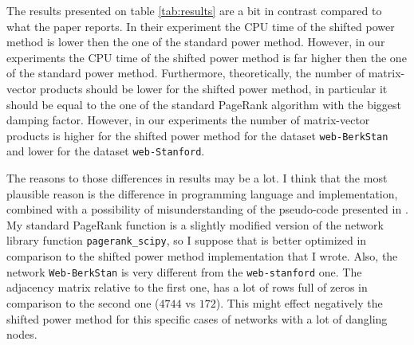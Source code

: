 \noindent The results presented on table \ref{tab:results} are a bit in contrast compared to what the paper \cite{SHEN2022126799} reports. In their experiment the CPU time of the shifted power method is lower then the one of the standard power method. However, in our experiments the CPU time of the shifted power method is far higher then the one of the standard power method. Furthermore, theoretically, the number of matrix-vector products should be lower for the shifted power method, in particular it should be equal to the one of the standard PageRank algorithm with the biggest damping factor. However, in our experiments the number of matrix-vector products is higher for the shifted power method for the dataset \texttt{web-BerkStan} and lower for the dataset \texttt{web-Stanford}. \vspace*{0.5cm}

\noindent The reasons to those differences in results may be a lot. I think that the most plausible reason is the difference in programming language and implementation, combined with a possibility of misunderstanding of the pseudo-code presented in \cite{SHEN2022126799}. My standard PageRank function is a slightly modified version of the network library function \texttt{pagerank\_scipy}, so I suppose that is better optimized in comparison to the shifted power method implementation that I wrote. Also, the network \texttt{Web-BerkStan} is very different from the \texttt{web-stanford} one. The adjacency matrix relative to the first one, has a lot of rows full of zeros in comparison to the second one ($4744$ vs $172$). This might effect negatively the shifted power method for this specific cases of networks with a lot of dangling nodes. \vspace*{0.5cm}
